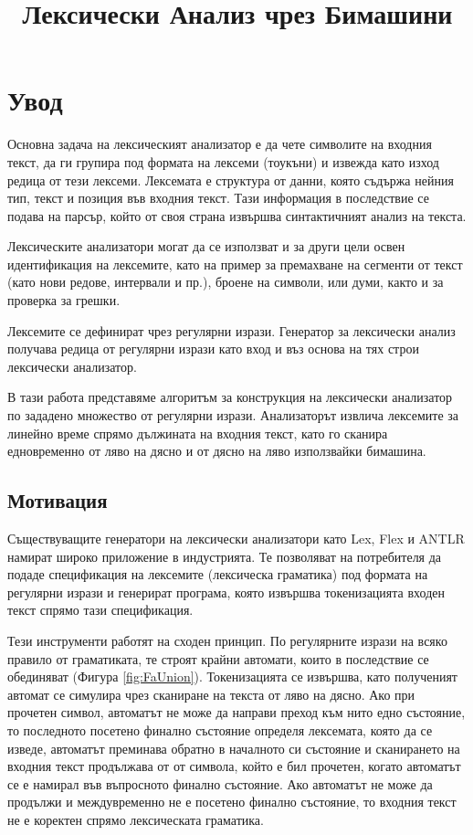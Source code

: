\documentclass[12pt, oneside]{article}
\title{Лексически Анализ чрез Бимашини}
\theoremstyle{definition}
\begin{document}
\tableofcontents
\pagebreak

\section{Увод}

Основна задача на лексическият анализатор е да чете символите на входния текст, да ги групира под формата на лексеми (тоукъни) и извежда като изход редица от тези лексеми. Лексемата е структура от данни, която съдържа нейния тип, текст и позиция във входния текст. Тази информация в последствие се подава на парсър, който от своя страна извършва синтактичният анализ на текста.

Лексическите анализатори могат да се използват и за други цели освен идентификация на лексемите, като на пример за премахване на сегменти от текст (като нови редове, интервали и пр.), броене на символи, или думи, както и за проверка за грешки.

Лексемите се дефинират чрез регулярни изрази. Генератор за лексически анализ получава редица от регулярни изрази като вход и въз основа на тях строи лексически анализатор.

В тази работа представяме алгоритъм за конструкция на лексически анализатор по зададено множество от регулярни изрази. Анализаторът извлича лексемите за линейно време спрямо дължината на входния текст, като го сканира едновременно от ляво на дясно и от дясно на ляво използвайки бимашина.


\subsection{Мотивация}

Съществуващите генератори на лексически анализатори като Lex, Flex и ANTLR намират широко приложение в индустрията. Те позволяват на потребителя да подаде спецификация на лексемите (лексическа граматика) под формата на регулярни изрази и генерират програма, която извършва токенизацията входен текст спрямо тази спецификация.

Тези инструменти работят на сходен принцип. По регулярните изрази на всяко правило от граматиката, те строят крайни автомати, които в последствие се обединяват (Фигура \ref{fig:FaUnion}). Токенизацията се извършва, като полученият автомат се симулира чрез сканиране на текста от ляво на дясно. 
Ако при прочетен символ, автоматът не може да направи преход към нито едно състояние, то последното посетено финално състояние определя лексемата, която да се изведе, автоматът преминава обратно в началното си състояние и сканирането на входния текст продължава от от символа, който е бил прочетен, когато автоматът се е намирал във въпросното финално състояние. Ако автоматът не може да продължи и междувременно не е посетено финално състояние, то входния текст не е коректен спрямо лексическата граматика.
\end{document}
